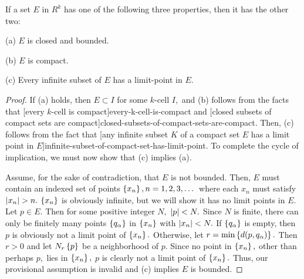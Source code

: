 \documentclass{article}
\begin{document}
\begin{theorem}\label{heine-borel}
If a set $E$ in $R^k$ has one of the following three properties, then it has the other two:

(a) $E$ is \@{closed} and \@{bounded}.

(b) $E$ is \@{compact}.

(c) Every \@{infinite} subset of $E$ has a \@{limit-point} in $E.$
\end{theorem}
\begin{proof}
If (a) holds, then $E \subset I$ for some $k$-cell $I,$ and (b) follows from the facts that \@[every $k$-cell is compact]{every-k-cell-is-compact} and \@[closed subsets of compact sets are compact]{closed-subsets-of-compact-sets-are-compact}. Then, (c) follows from the fact that \@[any infinite subset $K$ of a compact set $E$ has a limit point in $E$]{infinite-subset-of-compact-set-has-limit-point}. To complete the cycle of implication, we must now show that (c) implies (a).

Assume, for the sake of contradiction, that $E$ is not \@{bounded}. Then, $E$ must contain an indexed set of points $\left\{ x_n \right\}, n = 1, 2, 3, \dots$ where each $x_n$ must satisfy $\left| x_n \right| > n.$ $\left\{ x_n \right\}$ is obviously infinite, but we will show it has no limit points in $E.$ Let $p \in E.$ Then for some positive integer $N,$ $\left| p \right| < N.$ Since $N$ is finite, there can only be finitely many points $\left\{ q_\alpha \right\}$ in $\left\{ x_n \right\}$ with $\left| x_n \right| < N.$ If $\left\{ q_\alpha \right\}$ is empty, then $p$ is obviously not a limit point of $\left\{ x_n \right\}.$ Otherwise, let $r = \min\left\{ d(p, q_\alpha) \right\}.$ Then $r > 0$ and let $N_r\left\{ p \right\}$ be a \@{neighborhood} of $p.$ Since no point in $\left\{ x_n \right\},$ other than perhaps $p,$ lies in $\left\{ x_n \right\},$ $p$ is clearly not a limit point of $\left\{ x_n \right\}.$ Thus, our provisional assumption is invalid and (c) implies $E$ is bounded.


\end{proof}
\end{document}
